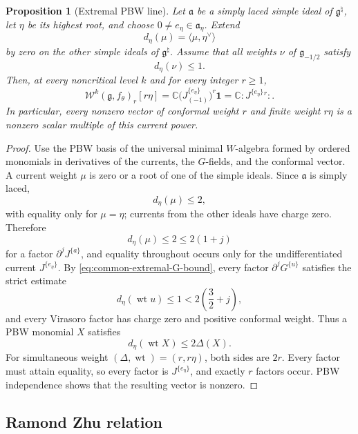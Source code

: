 \documentclass[11pt,reqno]{amsart}
\newtheorem{proposition}[theorem]{Proposition}
\theoremstyle{definition}
\theoremstyle{remark}
\begin{document}
\begin{proposition}[Extremal PBW line]
\label{prop:common-extremal-PBW-line}
Let \(\mathfrak a\) be a simply laced simple ideal of
\(\mathfrak g^\natural\), let \(\eta\) be its highest root, and choose
\(0\ne e_\eta\in\mathfrak a_\eta\).  Extend
\[
 d_\eta(\mu)=\langle\mu,\eta^\vee\rangle
\]
by zero on the other simple ideals of \(\mathfrak g^\natural\).  Assume that
all weights \(\nu\) of \(\mathfrak g_{-1/2}\) satisfy
\begin{equation}
 d_\eta(\nu)\le1.
 \label{eq:common-extremal-G-bound}
\end{equation}
Then, at every noncritical level \(k\) and for every integer \(r\ge1\),
\begin{equation*}
 \mathcal W^k(\mathfrak g,f_\theta)_r[r\eta]
 =\mathbb C\bigl(J^{\{e_\eta\}}_{(-1)}\bigr)^r\mathbf1
 =\mathbb C:J^{\{e_\eta\}}{}^r:.
\end{equation*}
In particular, every nonzero vector of conformal weight \(r\) and finite
weight \(r\eta\) is a nonzero scalar multiple of this current power.
\end{proposition}

\begin{proof}
Use the PBW basis of the universal minimal \(W\)-algebra formed by ordered
monomials in derivatives of the currents, the \(G\)-fields, and the conformal
vector.  A current weight \(\mu\) is zero or a root of one of the simple
ideals.  Since \(\mathfrak a\) is simply laced,
\[
 d_\eta(\mu)\le2,
\]
with equality only for \(\mu=\eta\); currents from the other ideals have
charge zero.  Therefore
\[
 d_\eta(\mu)\le2\le2(1+j)
\]
for a factor \(\partial^jJ^{\{a\}}\), and equality throughout occurs only
for the undifferentiated current \(J^{\{e_\eta\}}\).  By
\eqref{eq:common-extremal-G-bound}, every factor
\(\partial^jG^{\{u\}}\) satisfies the strict estimate
\[
 d_\eta(\operatorname{wt}u)\le1
 <2\left(\frac32+j\right),
\]
and every Virasoro factor has charge zero and positive conformal weight.
Thus a PBW monomial \(X\) satisfies
\[
 d_\eta(\operatorname{wt}X)\le2\Delta(X).
\]
For simultaneous weight \((\Delta,\operatorname{wt})=(r,r\eta)\), both
sides are \(2r\).  Every factor must attain equality, so every factor is
\(J^{\{e_\eta\}}\), and exactly \(r\) factors occur.  PBW independence
shows that the resulting vector is nonzero.
\end{proof}

\subsection{Ramond Zhu relation}
\end{document}
